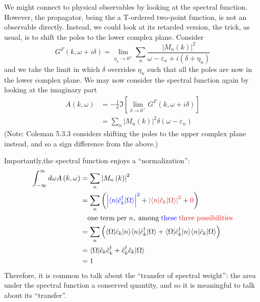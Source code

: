 We might connect to physical observables by looking at the spectral function. However, the propagator, being the a T-ordered two-point function, is not an observable directly. Instead, we could look at its retarded version, the trick, as usual, is to shift the poles to the lower complex plane. Consider
\[ G^F\left( k,\omega +i\delta \right) =\lim_{\eta _n\rightarrow 0^{\pm}} \sum_n{\frac{\left| M_n\left( k \right) \right|^2}{\omega -\varepsilon _n+i\left( \delta +\eta _n \right)}}\]
and we take the limit in which $\delta$ overrides $\eta_n$ such that all the poles are now in the lower complex plane. We may now consider the spectral function again by looking at the imaginary part
\begin{align*}
    A\left( k,\omega \right) &=-\frac{1}{\pi}\Im \left[ \lim_{\delta \rightarrow 0^+} G^F\left( k,\omega +i\delta \right) \right] \\
    &=\sum_n{\left| M_n\left( k \right) \right|^2\delta \left( \omega -\varepsilon _n \right)}
\end{align*}
(Note: Coleman 5.3.3 considers shifting the poles to the upper complex plane instead, and so a sign difference from the above.)

Importantly,the spectral function enjoys a ``normalization'':
\begin{align*}
    \int_{-\infty}^{\infty}{d\omega A\left( k,\omega \right)}&=\sum_n{\left| M_n\left( k \right) \right|^2}\\
    &=\sum_n{\left( {\color[RGB]{0, 0, 240} \left| \langle n|\hat{c}_{k}^{\dagger}|\Omega \rangle \right|^2}+{\color[RGB]{178, 34, 34} \left| \langle n|\hat{c}_k|\Omega \rangle \right|^2}+{\color{red} 0} \right)}\\
    &\quad \mathrm{one}\; \mathrm{term}\; \mathrm{per}\; n,\; \mathrm{among}\; {\color[RGB]{0, 0, 240} \mathrm{these}}\; {\color[RGB]{178, 34, 34} \mathrm{three}}\; {\color{red} \mathrm{possibilities}}\\
    &=\sum_n{\left( \langle \Omega |\hat{c}_k|n\rangle \langle n|\hat{c}_{k}^{\dagger}|\Omega \rangle +\langle \Omega |\hat{c}_{k}^{\dagger}|n\rangle \langle n|\hat{c}_k|\Omega \rangle \right)}\\
    &=\langle \Omega |\hat{c}_k\hat{c}_{k}^{\dagger}+\hat{c}_{k}^{\dagger}\hat{c}_k|\Omega \rangle \\
    &=1
\end{align*}
Therefore, it is common to talk about the ``transfer of spectral weight'': the area under the spectral function a conserved quantity, and so it is meaningful to talk about its ``transfer''.

